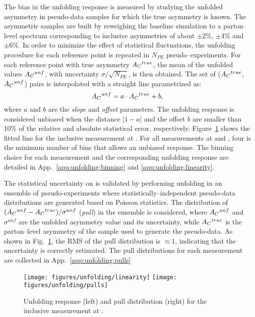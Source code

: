 The bias in the unfolding response is measured by studying the
unfolded asymmetry in pseudo-data samples for which the true
asymmetry is known. The asymmetric samples are built by reweighing the
baseline \ttbar{} simulation to a parton--level \dy{} spectrum
corresponding to inclusive asymmetries of about $\pm2\%$, $\pm4\%$ and
$\pm6\%$.
In order to minimize the effect of statistical fluctuations, the
unfolding procedure for each reference point is repeated in $N_{PE}$
pseudo--experiments. For each reference point with true asymmetry
$A_C{}^{true}$, the mean of the unfolded values $A_C{}^{unf}$, with
uncertainty $\sigma/\sqrt{N_{PE}}$, is then obtained. The set of
($A_C{}^{true}$,$A_C{}^{unf}$) pairs is interpolated with a straight
line parametrized as:
\begin{equation}
A_C{}^{unf}=a\cdot{}A_C{}^{true}+b,
\end{equation}
where $a$ and $b$ are the {\it slope} and {\it offset} parameters.
The unfolding response is considered unbiased when the distance
$|1-a|$ and the offset $b$ are smaller than 10\% of the relative and
absolute statistical error, respectively.
Figure~\ref{fig:pulllinearity} shows the fitted line for
the inclusive \ac{} measurement at \eighttev{}.
For all measurements at \seventev{} and \eighttev{}, four is the
minimum number of \dy{} bins that allows an unbiased
response. The binning choice for each measurement and the
corresponding unfolding response are detailed in
App.~\ref{app:unfolding:binning} and \ref{app:unfolding:linearity}.

The statistical uncertainty on \ac{} is validated by performing unfolding in
an ensemble of pseudo-experiments where statistically--independent
pseudo-data distributions are generated based on Poisson statistics.  
The distribution of $(A_C{}^{unf}-A_C{}^{true})/\sigma^{unf}$
({\it pull}) in the ensemble is considered, where $A_C{}^{unf}$ and
$\sigma^{unf}$ are the unfolded asymmetry value and its uncertainty,
while $A_C{}^{true}$ is the parton--level asymmetry of the sample used
to generate the pseudo-data. As shown in Fig.~\ref{fig:pulllinearity}, the
RMS of the pull distribution is $\approx{}1$, indicating that the
uncertainty is correctly estimated. The pull distributions for each
measurement are collected in App.~\ref{app:unfolding:pulls}

\begin{figure}[!htb]\centering
  \texttt{[image: figures/unfolding/linearity]}
  \texttt{[image: figures/unfolding/pulls]}
  \caption{Unfolding response (left) and pull distribution (right) for the
    inclusive \ac{} measurement at \eighttev{}.}
  \label{fig:pulllinearity}
\end{figure}

